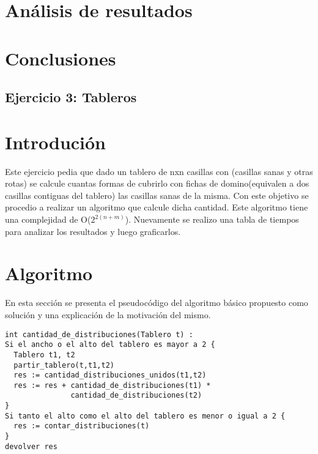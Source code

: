 \documentclass[a4paper, 12pt] {article}
\begin{document}
\section*{An\'alisis de resultados}

\section*{Conclusiones}
\newpage

\begin{center}
 \section*{Ejercicio 3: Tableros}
\end{center}

\bigskip
\section*{Introduci\'on}
Este ejercicio pedia que dado un tablero de nxn casillas con (casillas sanas y otras rotas) se calcule cuantas formas de cubrirlo con fichas de domino(equivalen a dos casillas contiguas del tablero) las casillas sanas de la misma.
Con este objetivo se procedio a realizar un algoritmo que calcule dicha cantidad. Este algoritmo tiene una complejidad de O($2^{2\left(n+m \right) }$). Nuevamente se realizo una tabla de tiempos para analizar los resultados y luego graficarlos. 
\section*{Algoritmo}
En esta secci\'on se presenta el pseudoc\'odigo del algoritmo b\'asico propuesto como soluci\'on y una explicaci\'on de la motivaci\'on del mismo.
\begin{verbatim}
int cantidad_de_distribuciones(Tablero t) :
Si el ancho o el alto del tablero es mayor a 2 {
  Tablero t1, t2
  partir_tablero(t,t1,t2)
  res := cantidad_distribuciones_unidos(t1,t2) 
  res := res + cantidad_de_distribuciones(t1) * 
               cantidad_de_distribuciones(t2)
}
Si tanto el alto como el alto del tablero es menor o igual a 2 {
  res := contar_distribuciones(t)
}
devolver res
\end{verbatim}
\end{document}
